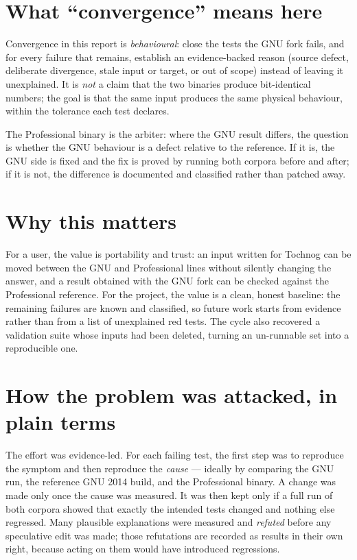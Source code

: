 \documentclass[11pt,a4paper]{report}
\begin{document}
\section{What ``convergence'' means here}
\label{sec:intro-convergence}

Convergence in this report is \emph{behavioural}: close the tests the GNU fork
fails, and for every failure that remains, establish an evidence-backed reason
(source defect, deliberate divergence, stale input or target, or out of scope)
instead of leaving it unexplained. It is \emph{not} a claim that the two
binaries produce bit-identical numbers; the goal is that the same input
produces the same physical behaviour, within the tolerance each test declares.

The Professional binary is the arbiter: where the GNU result differs, the
question is whether the GNU behaviour is a defect relative to the reference.
If it is, the GNU side is fixed and the fix is proved by running both corpora
before and after; if it is not, the difference is documented and classified
rather than patched away.

\section{Why this matters}

For a user, the value is portability and trust: an input written for Tochnog
can be moved between the GNU and Professional lines without silently changing
the answer, and a result obtained with the GNU fork can be checked against the
Professional reference. For the project, the value is a clean, honest baseline:
the remaining failures are known and classified, so future work starts from
evidence rather than from a list of unexplained red tests. The cycle also
recovered a validation suite whose inputs had been deleted, turning an
un-runnable set into a reproducible one.

\section{How the problem was attacked, in plain terms}

The effort was evidence-led. For each failing test, the first step was to
reproduce the symptom and then reproduce the \emph{cause} --- ideally by
comparing the GNU run, the reference GNU 2014 build, and the Professional
binary. A change was made only once the cause was measured. It was then kept
only if a full run of both corpora showed that exactly the intended tests
changed and nothing else regressed. Many plausible explanations were measured
and \emph{refuted} before any speculative edit was made; those refutations are
recorded as results in their own right, because acting on them would have
introduced regressions.
\end{document}

